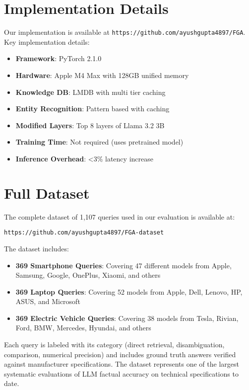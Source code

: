 \documentclass[11pt, a4paper]{article}
\theoremstyle{definition}
\begin{document}
\section{Implementation Details}

Our implementation is available at \texttt{https://github.com/ayushgupta4897/FGA}. Key implementation details:

\begin{itemize}
    \item \textbf{Framework}: PyTorch 2.1.0
    \item \textbf{Hardware}: Apple M4 Max with 128GB unified memory
    \item \textbf{Knowledge DB}: LMDB with multi tier caching
    \item \textbf{Entity Recognition}: Pattern based with caching
    \item \textbf{Modified Layers}: Top 8 layers of Llama 3.2 3B
    \item \textbf{Training Time}: Not required (uses pretrained model)
    \item \textbf{Inference Overhead}: <3\% latency increase
\end{itemize}

\section{Full Dataset}

The complete dataset of 1,107 queries used in our evaluation is available at:\\
\centerline{\texttt{https://github.com/ayushgupta4897/FGA-dataset}}
The dataset includes:

\begin{itemize}
    \item \textbf{369 Smartphone Queries}: Covering 47 different models from Apple, Samsung, Google, OnePlus, Xiaomi, and others
    \item \textbf{369 Laptop Queries}: Covering 52 models from Apple, Dell, Lenovo, HP, ASUS, and Microsoft
    \item \textbf{369 Electric Vehicle Queries}: Covering 38 models from Tesla, Rivian, Ford, BMW, Mercedes, Hyundai, and others
\end{itemize}

Each query is labeled with its category (direct retrieval, disambiguation, comparison, numerical precision) and includes ground truth answers verified against manufacturer specifications. The dataset represents one of the largest systematic evaluations of LLM factual accuracy on technical specifications to date.
\end{document}
